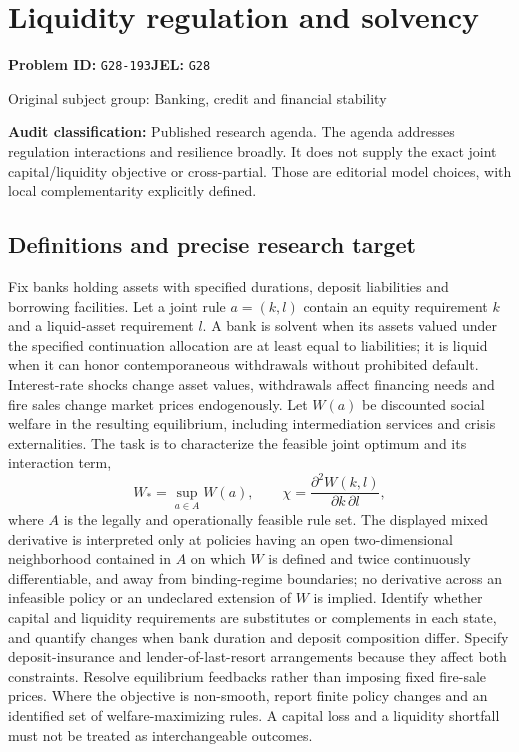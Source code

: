 \documentclass[11pt,a4paper]{article}
\begin{document}
\section*{Liquidity regulation and solvency}
\textbf{Problem ID:} \texttt{G28-193}\quad \textbf{JEL:} \texttt{G28}\par
\label{problem:OP-0321}
{\sffamily\small\color{muted}Original subject group: Banking, credit and financial stability\par}
\label{definitions:problem:30007603}
\textbf{Audit classification:} Published research agenda. The agenda addresses regulation interactions and resilience broadly. It does not supply the exact joint capital/liquidity objective or cross-partial. Those are editorial model choices, with local complementarity explicitly defined.
\subsection*{Definitions and precise research target}
Fix banks holding assets with specified durations, deposit liabilities and borrowing facilities. Let a joint rule \(a=(k,l)\) contain an equity requirement \(k\) and a liquid-asset requirement \(l\). A bank is solvent when its assets valued under the specified continuation allocation are at least equal to liabilities; it is liquid when it can honor contemporaneous withdrawals without prohibited default. Interest-rate shocks change asset values, withdrawals affect financing needs and fire sales change market prices endogenously. Let \(W(a)\) be discounted social welfare in the resulting equilibrium, including intermediation services and crisis externalities. The task is to characterize the feasible joint optimum and its interaction term,
\[W_*=\sup_{a\in A}W(a),\qquad\chi=\frac{\partial^2W(k,l)}{\partial k\,\partial l},\]
where \(A\) is the legally and operationally feasible rule set. The displayed mixed derivative is interpreted only at policies having an open two-dimensional neighborhood contained in \(A\) on which \(W\) is defined and twice continuously differentiable, and away from binding-regime boundaries; no derivative across an infeasible policy or an undeclared extension of \(W\) is implied. Identify whether capital and liquidity requirements are substitutes or complements in each state, and quantify changes when bank duration and deposit composition differ. Specify deposit-insurance and lender-of-last-resort arrangements because they affect both constraints. Resolve equilibrium feedbacks rather than imposing fixed fire-sale prices. Where the objective is non-smooth, report finite policy changes and an identified set of welfare-maximizing rules. A capital loss and a liquidity shortfall must not be treated as interchangeable outcomes.
\end{document}
